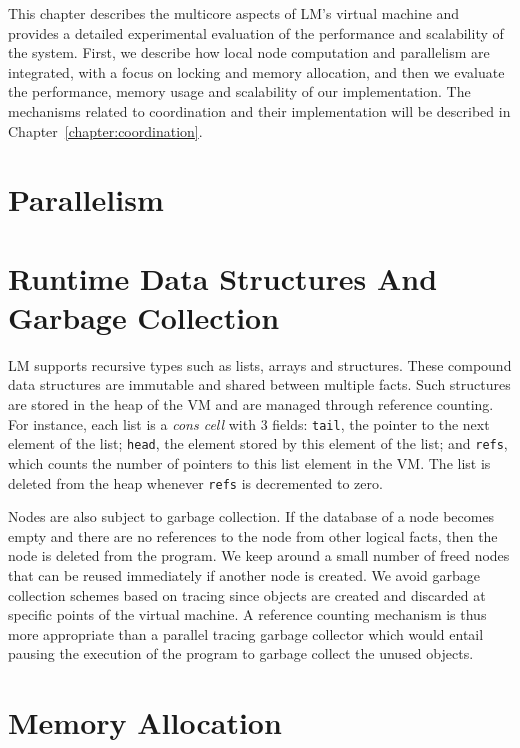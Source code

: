 This chapter describes the multicore aspects of LM's virtual machine and
provides a detailed experimental evaluation of the performance and scalability
of the system. First, we describe how local node computation and parallelism are
integrated, with a focus on locking and memory allocation, and then we evaluate
the performance, memory usage and scalability of our implementation. The
mechanisms related to coordination and their implementation will be described in
Chapter~\ref{chapter:coordination}.

\section{Parallelism}\label{sec:implementation:parallelism}



\section{Runtime Data Structures And Garbage Collection}

LM supports recursive types such as lists, arrays and structures. These compound
data structures are immutable and shared between multiple facts. Such structures
are stored in the heap of the VM and are managed through reference counting. For
instance, each list is a \emph{cons cell} with 3 fields: \texttt{tail}, the
pointer to the next element of the list; \texttt{head}, the element stored by
this element of the list; and \texttt{refs}, which counts the number of pointers
to this list element in the VM. The list is deleted from the heap whenever
\texttt{refs} is decremented to zero.

Nodes are also subject to garbage collection. If the database of a node becomes
empty and there are no references to the node from other logical facts, then the
node is deleted from the program. We keep around a small number of freed nodes
that can be reused immediately if another node is created. We avoid garbage
collection schemes based on tracing since objects are created and discarded at
specific points of the virtual machine. A reference counting mechanism is thus
more appropriate than a parallel tracing garbage collector which would entail
pausing the execution of the program to garbage collect the unused objects.

\section{Memory Allocation}\label{section:implementation:allocation}


